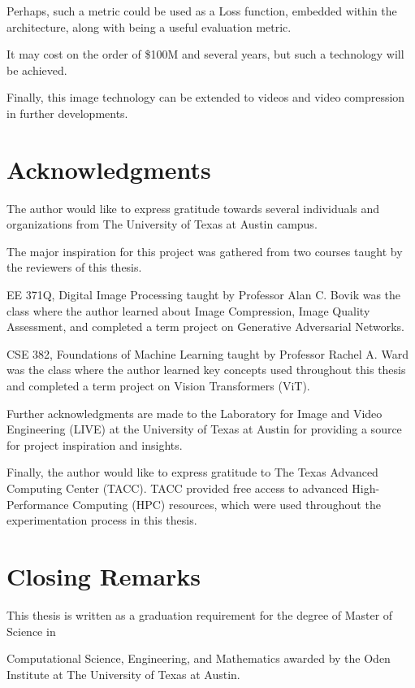 Perhaps, such a metric could be used as a Loss function, embedded within the architecture,
along with being a useful evaluation metric.


It may cost on the order of \$100M and several years, but such a technology will be achieved.


Finally, this image technology can be extended to videos and video compression in further developments.


\section{Acknowledgments}

The author would like to express gratitude towards several individuals and organizations
from The University of Texas at Austin campus.


The major inspiration for this project was gathered from two courses taught by the
reviewers of this thesis.


EE 371Q, Digital Image Processing taught by Professor Alan C. Bovik was the class
where the author learned about 
Image Compression, Image Quality Assessment, and completed a term
project on Generative Adversarial Networks.


CSE 382, Foundations of Machine Learning taught by Professor Rachel A. Ward 
was the class where the author learned key concepts used throughout this thesis
and completed a term project on Vision Transformers (ViT).


Further acknowledgments are made to the Laboratory for Image and Video Engineering (LIVE) at the 
University of Texas at Austin for providing a source for project inspiration and insights.


Finally, the author would like to express gratitude to The Texas Advanced Computing Center (TACC).
TACC provided free access to advanced High-Performance Computing (HPC) resources,
which were used throughout the experimentation process in this thesis.

\section{Closing Remarks}

This thesis is written as a graduation requirement for the degree of Master of Science in

Computational Science, Engineering, and Mathematics awarded by the Oden Institute at 
The University of Texas at Austin.


